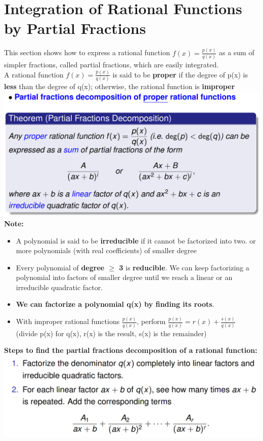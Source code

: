 \documentclass{article}
\begin{document}
\section{Integration of Rational Functions by Partial Fractions}
This section shows how to express a rational function $f(x)=\displaystyle\frac{p(x)}{q(x)}$ as a sum of simpler fractions, called partial fractions, which are easily integrated.\\
A rational function $f(x)=\displaystyle\frac{p(x)}{q(x)}$ is said to be \textbf{proper} if the degree of p(x) is \textbf{less} than the degree of q(x); otherwise, the rational function is \textbf{improper}\\
\includegraphics[width=1\linewidth]{partial.png}
\textbf{Note: }
\begin{itemize}
    \item A polynomial is said to be \textbf{irreducible} if it cannot be factorized into two.
or more polynomials (with real coefficients) of smaller degree
    \item Every polynomial of \textbf{degree $\geq$ 3} is \textbf{reducible}. We can keep factorizing a polynomial into factors of smaller degree until we reach a linear or an irreducible quadratic factor.
    \item \textbf{We can factorize a polynomial q(x) by finding its roots}.
    \item With improper rational functions $\displaystyle\frac{p(x)}{q(x)}$, perform $\displaystyle\frac{p(x)}{q(x)}=r(x)+\displaystyle\frac{s(x)}{q(x)}$\\ 
    (divide p(x) for q(x), r(x) is the result, s(x) is the remainder)
\end{itemize}
\newpage
\textbf{Steps to find the partial fractions decomposition of a rational function:}\\
\includegraphics[width=0.75\linewidth]{step.png}\\
\end{document}
